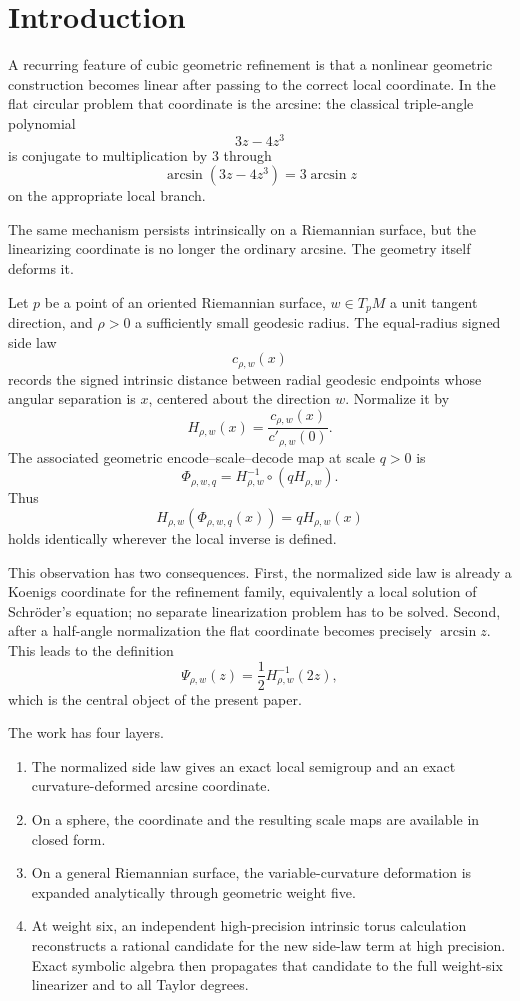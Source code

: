 \documentclass[11pt]{article}
\theoremstyle{definition}
\theoremstyle{remark}
\begin{document}
\section{Introduction}
\label{sec:introduction}

A recurring feature of cubic geometric refinement is that a nonlinear
geometric construction becomes linear after passing to the correct local
coordinate.  In the flat circular problem that coordinate is the arcsine:
the classical triple-angle polynomial
\[
3z-4z^3
\]
is conjugate to multiplication by \(3\) through
\[
\arcsin(3z-4z^3)=3\arcsin z
\]
on the appropriate local branch.

The same mechanism persists intrinsically on a Riemannian surface, but the
linearizing coordinate is no longer the ordinary arcsine.  The geometry
itself deforms it.

Let \(p\) be a point of an oriented Riemannian surface, \(w\in T_pM\) a unit
tangent direction, and \(\rho>0\) a sufficiently small geodesic radius.
The equal-radius signed side law
\[
c_{\rho,w}(x)
\]
records the signed intrinsic distance between radial geodesic endpoints whose
angular separation is \(x\), centered about the direction \(w\).  Normalize it
by
\[
H_{\rho,w}(x)
=
\frac{c_{\rho,w}(x)}{c'_{\rho,w}(0)}.
\]
The associated geometric encode--scale--decode map at scale \(q>0\) is
\[
\Phi_{\rho,w,q}
=
H_{\rho,w}^{-1}\circ(qH_{\rho,w}).
\]
Thus
\[
H_{\rho,w}\!\left(\Phi_{\rho,w,q}(x)\right)
=
qH_{\rho,w}(x)
\]
holds identically wherever the local inverse is defined.

This observation has two consequences.  First, the normalized side law is
already a Koenigs coordinate for the refinement family, equivalently a local
solution of Schr\"oder's equation; no separate linearization problem has to be
solved.  Second, after a half-angle
normalization the flat coordinate becomes precisely \(\arcsin z\).  This leads
to the definition
\[
\Psi_{\rho,w}(z)
=
\frac12H_{\rho,w}^{-1}(2z),
\]
which is the central object of the present paper.

The work has four layers.
\begin{enumerate}
\item The normalized side law gives an exact local semigroup and an exact
      curvature-deformed arcsine coordinate.
\item On a sphere, the coordinate and the resulting scale maps are available
      in closed form.
\item On a general Riemannian surface, the variable-curvature deformation is
      expanded analytically through geometric weight five.
\item At weight six, an independent high-precision intrinsic torus
      calculation reconstructs a rational candidate for the new side-law term at
      high precision.  Exact symbolic algebra then propagates that
      candidate to the full weight-six linearizer and to all Taylor degrees.
\end{enumerate}
\end{document}
